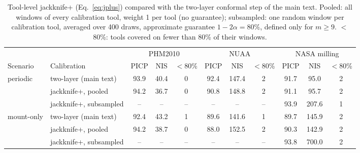 \begin{table}[!htbp]
\centering
\caption{Tool-level jackknife+ (Eq.~\eqref{eq:jplus}) compared with the two-layer conformal step of the main text. Pooled: all windows of every calibration tool, weight 1 per tool (no guarantee); subsampled: one random window per calibration tool, averaged over 400 draws, approximate guarantee $1-2\alpha=80\%$, defined only for $m\ge9$. $<$80\%: tools covered on fewer than 80\% of their windows.}
\label{tab:Sjack}
\footnotesize\setlength{\tabcolsep}{3pt}
\begin{tabular}{llccccccccc}
\toprule
 & & \multicolumn{3}{c}{PHM2010} & \multicolumn{3}{c}{NUAA} & \multicolumn{3}{c}{NASA milling}\\
\cmidrule(lr){3-5}\cmidrule(lr){6-8}\cmidrule(lr){9-11}
Scenario & Calibration & PICP & NIS & $<$80\% & PICP & NIS & $<$80\% & PICP & NIS & $<$80\%\\
\midrule
periodic & two-layer (main text) & 93.9 & 40.4 & 0 & 92.4 & 147.4 & 2 & 91.7 & 95.0 & 2\\
 & jackknife+, pooled & 94.2 & 36.7 & 0 & 90.8 & 148.8 & 2 & 91.1 & 95.7 & 2\\
 & jackknife+, subsampled & -- & -- & -- & -- & -- & -- & 93.9 & 207.6 & 1\\
\midrule
mount-only & two-layer (main text) & 92.4 & 43.2 & 1 & 89.6 & 141.6 & 1 & 89.7 & 145.9 & 2\\
 & jackknife+, pooled & 94.2 & 38.7 & 0 & 88.0 & 152.5 & 2 & 90.3 & 142.9 & 2\\
 & jackknife+, subsampled & -- & -- & -- & -- & -- & -- & 93.8 & 700.0 & 2\\
\bottomrule
\end{tabular}
\end{table}
